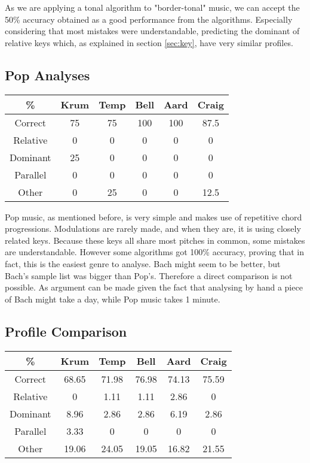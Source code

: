 As we are applying a tonal algorithm to "border-tonal" music, we can accept the 50\% accuracy obtained as a good performance from the algorithms. 
Especially considering that most mistakes were understandable, predicting the dominant of relative keys which, as explained in section \ref{sec:key}, have very similar profiles.
\subsection{Pop Analyses} \label{sec:pop}

\begin{center}
    \begin{tabular}{|c||c c c c c||} 
    \hline
    \% & Krum & Temp & Bell & Aard & Craig \\
    \hline\hline
    Correct & 75 & 75 & 100 & 100 & 87.5\\ 
    \hline
    Relative & 0 & 0 & 0 & 0 & 0\\
    \hline
    Dominant & 25 & 0 & 0 & 0 & 0\\
    \hline
    Parallel & 0 & 0 & 0 & 0 & 0\\
    \hline
    Other & 0 & 25 & 0 & 0 & 12.5\\
    \hline
   \end{tabular}
\end{center}

Pop music, as mentioned before, is very simple and makes use of repetitive chord progressions.
Modulations are rarely made, and when they are, it is using closely related keys.
Because these keys all share most pitches in common, some mistakes are understandable.
However some algorithms got 100\% accuracy, proving that in fact, this is the easiest genre to analyse.
Bach might seem to be better, but Bach's sample list was bigger than Pop's.
Therefore a direct comparison is not possible.
As argument can be made given the fact that analysing by hand a piece of Bach might take a day, while Pop music takes 1 minute.



\subsection{Profile Comparison} \label{sec:total_analyses}

\begin{center}
    \begin{tabular}{|c||c c c c c||} 
    \hline
    \% & Krum & Temp & Bell & Aard & Craig \\
    \hline\hline
    Correct & 68.65 & 71.98 & 76.98 & 74.13 & 75.59\\ 
    \hline
    Relative & 0 & 1.11 & 1.11 & 2.86 & 0\\
    \hline
    Dominant & 8.96 & 2.86 & 2.86 & 6.19 & 2.86\\
    \hline
    Parallel & 3.33 & 0 & 0 & 0 & 0\\
    \hline
    Other & 19.06 & 24.05 & 19.05 & 16.82 & 21.55\\
    \hline
   \end{tabular}
\end{center}

